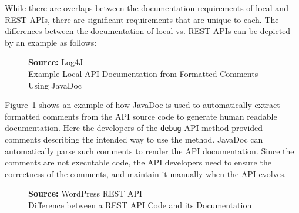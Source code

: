 While there are overlaps between the documentation requirements of local and REST APIs, there are significant requirements that are unique to each. The differences between the documentation
of local vs. REST APIs can be depicted by an example as follows:
\newcommand*{\captionsource}[2]{%
  \caption[{#1}]{%
    \textbf{Source:} #2%
    \\\hspace{\linewidth}%
    #1%
  }%
}
\begin{figure}[htb]
  \captionsource{Example Local API Documentation from Formatted Comments Using JavaDoc}{Log4J}
  \label{fig:javadoc}
\end{figure}



Figure~\ref{fig:javadoc} shows an example of how JavaDoc is used to automatically extract formatted comments from the API source code to
generate human readable documentation. Here the developers of the \texttt{debug} API method provided comments describing the intended way to use the method. JavaDoc can
automatically parse such comments to render the API documentation. Since the comments are not executable code, the API developers need to ensure the correctness of the
comments, and maintain it manually when the API evolves.

\begin{figure}[htb]
  \captionsource{Difference between a REST API Code and its Documentation}{WordPress REST API}
  \label{fig:wordpress_doc}
\end{figure}


